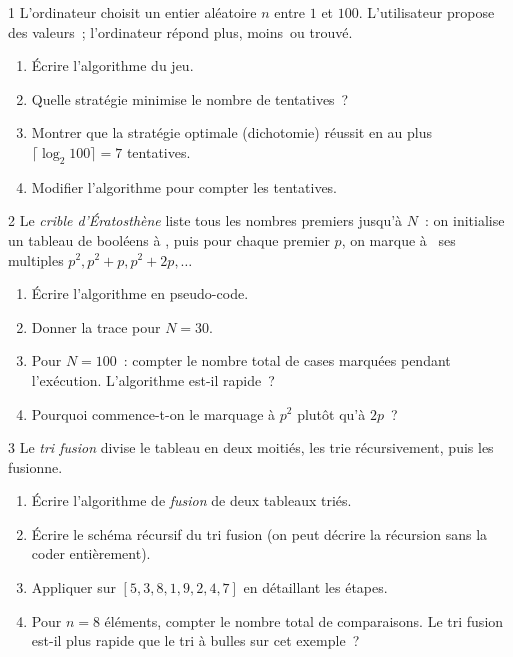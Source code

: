 \begin{probleme}{1}
L'ordinateur choisit un entier al\'eatoire $n$ entre $1$ et $100$.
L'utilisateur propose des valeurs~; l'ordinateur r\'epond
\og plus\fg, \og moins\fg\ ou \og trouv\'e\fg.
\begin{enumerate}
  \item \'Ecrire l'algorithme du jeu.
  \item Quelle strat\'egie minimise le nombre de tentatives~?
  \item Montrer que la strat\'egie optimale (dichotomie) r\'eussit
        en au plus $\lceil\log_2 100\rceil = 7$ tentatives.
  \item Modifier l'algorithme pour compter les tentatives.
\end{enumerate}
\end{probleme}

\begin{probleme}{2}
Le \emph{crible d'\'Eratosth\`ene} liste tous les nombres premiers
jusqu'\`a $N$~: on initialise un tableau de bool\'eens \`a \vrai,
puis pour chaque premier $p$, on marque \`a \faux\ ses multiples
$p^2, p^2+p, p^2+2p, \ldots$
\begin{enumerate}
  \item \'Ecrire l'algorithme en pseudo-code.
  \item Donner la trace pour $N=30$.
  \item Pour $N=100$~: compter le nombre total de cases marqu\'ees
        pendant l'ex\'ecution. L'algorithme est-il rapide~?
  \item Pourquoi commence-t-on le marquage \`a $p^2$ plut\^ot qu'\`a $2p$~?
\end{enumerate}
\end{probleme}

\begin{probleme}{3}
Le \emph{tri fusion} divise le tableau en deux moiti\'es,
les trie r\'ecursivement, puis les fusionne.
\begin{enumerate}
  \item \'Ecrire l'algorithme de \emph{fusion} de deux tableaux tri\'es.
  \item \'Ecrire le sch\'ema r\'ecursif du tri fusion
        (on peut d\'ecrire la r\'ecursion sans la coder enti\`erement).
  \item Appliquer sur $[5,3,8,1,9,2,4,7]$ en d\'etaillant les \'etapes.
  \item Pour $n=8$ \'el\'ements, compter le nombre total de comparaisons.
        Le tri fusion est-il plus rapide que le tri \`a bulles sur cet exemple~?
\end{enumerate}
\end{probleme}

